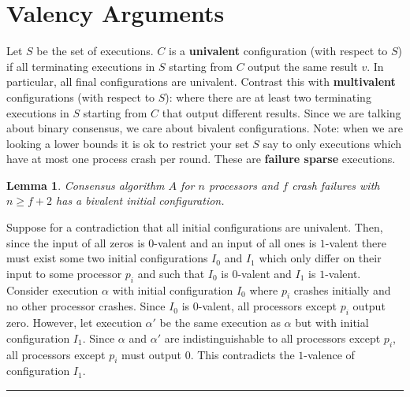 \documentclass[twoside]{article}
\newtheorem{lemma}[theorem]{Lemma}
\newenvironment{proof}{{\bf Proof:}}{\hfill\rule{2mm}{2mm}}
\begin{document}
\section{Valency Arguments}

Let $S$ be the set of executions. $C$ is a \textbf{univalent} configuration (with respect to $S$) if all terminating executions in $S$ starting from $C$ output the same result $v$. In particular, all final configurations are univalent. Contrast this with \textbf{multivalent} configurations (with respect to $S$): where there are at least two terminating executions in $S$ starting from $C$ that output different results. Since we are talking about binary consensus, we care about bivalent configurations. Note: when we are looking a lower bounds it is ok to restrict your set $S$ say to only executions which have at most one process crash per round. These are \textbf{failure sparse} executions.

\begin{lemma}
Consensus algorithm $A$ for $n$ processors and $f$ crash failures with $n \geq f+2$ has a bivalent initial configuration.
\end{lemma}
\begin{proof}
Suppose for a contradiction that all initial configurations are univalent. Then, since the input of all zeros is $0$-valent and an input of all ones is $1$-valent there must exist some two initial configurations $I_0$ and $I_1$ which only differ on their input to some processor $p_i$ and such that $I_0$ is $0$-valent and $I_1$ is $1$-valent. Consider execution $\alpha$ with initial configuration $I_0$ where $p_i$ crashes initially and no other processor crashes. Since $I_0$ is $0$-valent, all processors except $p_i$ output zero. However, let execution $\alpha'$ be the same execution as $\alpha$ but with initial configuration $I_1$. Since $\alpha$ and $\alpha'$ are indistinguishable to all processors except $p_i$, all processors except $p_i$ must output $0$. This contradicts the $1$-valence of configuration $I_1$.  
\end{proof}
\end{document}
